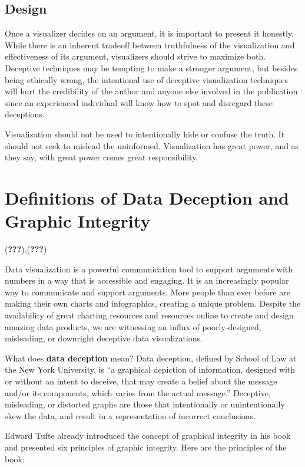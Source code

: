 \documentclass[]{book}
\theoremstyle{definition}
\theoremstyle{definition}
\theoremstyle{definition}
\theoremstyle{remark}
\begin{document}
\subsection{Design}\label{design}

Once a visualizer decides on an argument, it is important to present it
honestly. While there is an inherent tradeoff between truthfulness of
the visualization and effectiveness of its argument, visualizers should
strive to maximize both. Deceptive techniques may be tempting to make a
stronger argument, but besides being ethically wrong, the intentional
use of deceptive visualization techniques will hurt the credibility of
the author and anyone else involved in the publication since an
experienced individual will know how to spot and disregard these
deceptions.

Visualization should not be used to intentionally hide or confuse the
truth. It should not seek to mislead the uninformed. Visualization has
great power, and as they say, with great power comes great
responsibility.

\section{Definitions of Data Deception and Graphic
Integrity}\label{definitions-of-data-deception-and-graphic-integrity}

({\textbf{???}}),({\textbf{???}})

Data visualization is a powerful communication tool to support arguments
with numbers in a way that is accessible and engaging. It is an
increasingly popular way to communicate and support arguments. More
people than ever before are making their own charts and infographics,
creating a unique problem. Despite the availability of great charting
resources and resources online to create and design amazing data
products, we are witnessing an influx of poorly-designed, misleading, or
downright deceptive data visualizations.

What does \textbf{data deception} mean? Data deception, defined by
School of Law at the New York University, is ``a graphical depiction of
information, designed with or without an intent to deceive, that may
create a belief about the message and/or its components, which varies
from the actual message.'' Deceptive, misleading, or distorted graphs
are those that intentionally or unintentionally skew the data, and
result in a representation of incorrect conclusions.

Edward Tufte already introduced the concept of graphical integrity in
his book and presented six principles of graphic integrity. Here are the
principles of the book:
\end{document}
